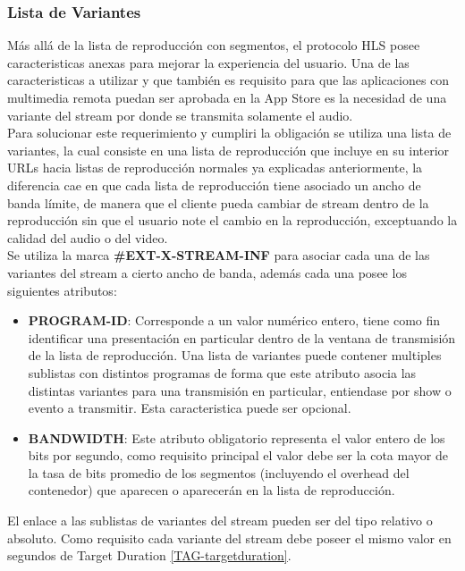 \subsubsection{Lista de Variantes}
Más allá de la lista de reproducción con segmentos, el protocolo HLS posee caracteristicas anexas para mejorar la experiencia del usuario.
Una de las caracteristicas a utilizar y que también es requisito para que las aplicaciones con multimedia remota puedan ser aprobada en la App Store es la necesidad de una variante del stream por donde se transmita solamente el audio.\\

Para solucionar este requerimiento y cumpliri la obligación se utiliza una lista de variantes, la cual consiste en una lista de reproducción que incluye en su interior URLs hacia listas de reproducción normales ya explicadas anteriormente, la diferencia cae en que cada lista de reproducción tiene asociado un ancho de banda límite, de manera que el cliente pueda cambiar de stream dentro de la reproducción sin que el usuario note el cambio en la reproducción, exceptuando la calidad del audio o del video.\\

Se utiliza la marca \textbf{\#EXT-X-STREAM-INF} para asociar cada una de las variantes del stream a cierto ancho de banda, además cada una posee los siguientes atributos:

\begin{itemize}

\item \textbf{PROGRAM-ID}: Corresponde a un valor numérico entero, tiene como fin identificar una presentación en particular dentro de la ventana de transmisión de la lista de reproducción. Una lista de variantes puede contener multiples sublistas con distintos programas de forma que este atributo asocia las distintas variantes para una transmisión en particular, entiendase por show o evento a transmitir. Esta caracteristica puede ser opcional.

\item \textbf{BANDWIDTH}: Este atributo obligatorio representa el valor entero de los bits por segundo, como requisito principal el valor debe ser la cota mayor de la tasa de bits promedio de los segmentos (incluyendo el overhead del contenedor) que aparecen o aparecerán en la lista de reproducción. 

\end{itemize}

El enlace a las sublistas de variantes del stream pueden ser del tipo relativo o absoluto. Como requisito cada variante del stream debe poseer el mismo valor en segundos de Target Duration \ref{TAG-targetduration}.

